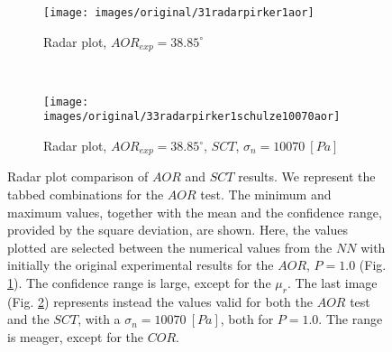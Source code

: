 \begin{figure}[htp] \centering
    \begin{subfigure}[b]{0.96\columnwidth}
        \texttt{[image: images/original/31radarpirker1aor]}
        \caption{Radar plot, $AOR_{exp} = 38.85 ^\circ$}
        \label{fig:31radarpirker1aor} 
    \end{subfigure}\\
        \begin{subfigure}[b]{0.96\columnwidth}
        \texttt{[image: images/original/33radarpirker1schulze10070aor]}
        \caption{Radar plot, $AOR_{exp} = 38.85
        ^\circ$, $SCT$, $\sigma_n=10070 ~[Pa]$}
        \label{fig:33radarpirker1schulze10070aor} 
    \end{subfigure}
    \caption[Radar plot comparison of AOR and SCT results]{Radar plot comparison
    of $AOR$ and $SCT$ results. We represent the tabbed combinations for the
    $AOR$ test.
    The minimum and maximum values, together with the mean and the confidence
	range, provided by the square deviation, are shown.
    Here, the values plotted are selected between the numerical
    values from the $NN$ with initially the original experimental results for
    the $AOR$, $P=1.0$ (Fig.
    \ref{fig:31radarpirker1aor}). 
    The confidence range is large, except for the $\mu_r$.
    The last image (Fig. \ref{fig:33radarpirker1schulze10070aor}) represents
    instead the values valid for both the $AOR$ test and the $SCT$, with a
    $\sigma_n=10070 ~[Pa]$, both for $P=1.0$.
    The range is meager, except for the $COR$.    }
    \label{fig:35schulze10070aorradarandcloud}
\end{figure}